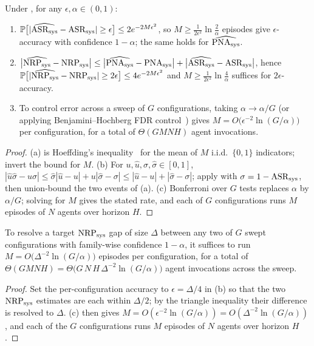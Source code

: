 \begin{theorem}
\label{thm:sample}
Under , for any $\epsilon,\alpha\in(0,1)$:
\begin{enumerate}[leftmargin=1.5em,label=(\alph*)]
\item $\mathbb{P}\bigl[|\widehat{\mathrm{ASR}_{\mathrm{sys}}}-\mathrm{ASR}_{\mathrm{sys}}|\ge\epsilon\bigr]\le 2e^{-2M\epsilon^{2}}$, so
$M\ge \tfrac{1}{2\epsilon^{2}}\ln\tfrac{2}{\alpha}$ episodes give $\epsilon$-accuracy with
confidence $1-\alpha$; the same holds for $\widehat{\mathrm{PNA}_{\mathrm{sys}}}$.
\item $\bigl|\widehat{\mathrm{NRP}_{\mathrm{sys}}}-\mathrm{NRP}_{\mathrm{sys}}\bigr|\le\bigl|\widehat{\mathrm{PNA}_{\mathrm{sys}}}-\mathrm{PNA}_{\mathrm{sys}}\bigr|+\bigl|\widehat{\mathrm{ASR}_{\mathrm{sys}}}-\mathrm{ASR}_{\mathrm{sys}}\bigr|$,
hence $\mathbb{P}\bigl[|\widehat{\mathrm{NRP}_{\mathrm{sys}}}-\mathrm{NRP}_{\mathrm{sys}}|\ge 2\epsilon\bigr]\le 4e^{-2M\epsilon^{2}}$ and
$M\ge\tfrac{1}{2\epsilon^{2}}\ln\tfrac{4}{\alpha}$ suffices for $2\epsilon$-accuracy.
\item To control error across a sweep of $G$ configurations, taking $\alpha\!\to\!\alpha/G$
(or applying Benjamini--Hochberg FDR control~\cite{benjamini1995controlling}) gives
$M=O\!\bigl(\epsilon^{-2}\ln(G/\alpha)\bigr)$ per configuration, for a total of
$\Theta(GMNH)$ agent invocations.
\end{enumerate}
\end{theorem}
\begin{proof}
(a) is Hoeffding's inequality~\cite{hoeffding1963probability} for the mean of $M$ i.i.d.\
$\{0,1\}$ indicators; invert the bound for $M$. (b) For $u,\hat u,\sigma,\hat\sigma\in[0,1]$,
$|\hat u\hat\sigma-u\sigma|\le\hat\sigma|\hat u-u|+u|\hat\sigma-\sigma|\le|\hat u-u|+|\hat\sigma-\sigma|$;
apply with $\sigma=1-\mathrm{ASR}_{\mathrm{sys}}$, then union-bound the two events of (a). (c) Bonferroni over
$G$ tests replaces $\alpha$ by $\alpha/G$; solving for $M$ gives the stated rate, and each
of $G$ configurations runs $M$ episodes of $N$ agents over horizon $H$.
\end{proof}

\begin{corollary}
\label{cor:budget}
To resolve a target $\mathrm{NRP}_{\mathrm{sys}}$ gap of size $\Delta$ between any two of $G$ swept configurations
with family-wise confidence $1-\alpha$, it suffices to run
$M=O\!\bigl(\Delta^{-2}\ln(G/\alpha)\bigr)$ episodes per configuration, for a total of
$\Theta(GMNH)=\Theta\!\bigl(G\,N\,H\,\Delta^{-2}\ln(G/\alpha)\bigr)$ agent invocations across
the sweep.
\end{corollary}
\begin{proof}
Set the per-configuration accuracy to $\epsilon=\Delta/4$ in (b) so that the
two $\mathrm{NRP}_{\mathrm{sys}}$ estimates are each within $\Delta/2$; by the triangle inequality their difference is
resolved to $\Delta$. \Cref{thm:sample}(c) then gives $M=O(\epsilon^{-2}\ln(G/\alpha))
=O(\Delta^{-2}\ln(G/\alpha))$, and each of the $G$ configurations runs $M$ episodes of $N$
agents over horizon $H$.
\end{proof}

